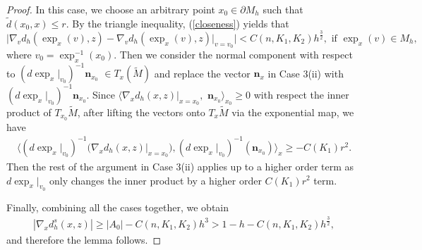 \documentclass[11pt,letterpaper]{amsart}
\numberwithin{equation}{section}
\theoremstyle{definition}
\theoremstyle{plain}
\theoremstyle{definition}
\theoremstyle{plain}
\theoremstyle{definition}
\theoremstyle{plain}
\begin{document}
\begin{proof}
In this case, we choose an arbitrary point $x_0\in \partial M_h$ such that $\widetilde{d}(x_0,x)\leqslant r$. By the triangle inequality, (\ref{closeness}) yields that
$$\big|\nabla_v d_h(\exp_x(v),z)-\nabla_{v} d_h(\exp_x(v),z)|_{v=v_0}\big| <C(n,K_1,K_2)h^{\frac{3}{2}}, \textrm{ if }\exp_x(v)\in M_h,$$
where $v_0=\exp_{x}^{-1}(x_0)$. Then we consider the normal component with respect to $(d\exp_{x}|_{v_0})^{-1} \textbf{n}_{x_0}$ $\in T_x(\widetilde{M})$ and replace the vector $\textbf{n}_x$ in Case 3(ii) with $(d\exp_{x}\big|_{v_0})^{-1} \textbf{n}_{x_0}$. Since $\langle \nabla_x d_h(x,z)|_{x=x_0},$ $\textbf{n}_{x_0} \rangle_{x_0}\geqslant 0$ with respect the inner product of $T_{x_0} \widetilde{M}$, after lifting the vectors onto $T_x \widetilde{M}$ via the exponential map, we have
\begin{eqnarray*}
\langle (d\exp_{x} |_{v_0})^{-1} \big(\nabla_x d_h(x,z) \big|_{x=x_0}\big), (d\exp_{x} |_{v_0})^{-1} (\textbf{n}_{x_0}) \rangle_x \geqslant -C(K_1)r^2.
\end{eqnarray*}
Then the rest of the argument in Case 3(ii) applies up to a higher order term as $d\exp_x|_{v_0}$ only changes the inner product by a higher order $C(K_1)r^2$ term.

\smallskip
Finally, combining all the cases together, we obtain
\begin{eqnarray*}
|\nabla_x d_h^s(x,z)|\geqslant |A_0|-C(n,K_1,K_2)h^3 >1-h-C(n,K_1,K_2)h^{\frac{3}{2}},
\end{eqnarray*}
and therefore the lemma follows.
\end{proof}
\end{document}
